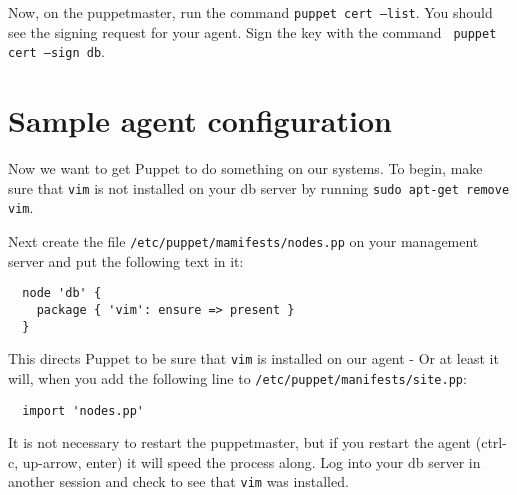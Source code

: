 \documentclass{article}
\begin{document}
Now, on the puppetmaster, run the command \texttt{puppet cert --list}.  You should see the signing request for your agent.  Sign the key with the command \texttt{ puppet cert --sign db}.

\section{Sample agent configuration}
Now we want to get Puppet to do something on our systems.  To begin, make sure that \texttt{vim} is not installed on your db server by running \texttt{sudo apt-get remove vim}.

Next create the file \texttt{/etc/puppet/mamifests/nodes.pp} on your management server and put the following text in it:
\begin{verbatim}
  node 'db' {
    package { 'vim': ensure => present }
  }
\end{verbatim}

This directs Puppet to be sure that \texttt{vim} is installed on our agent - Or at least it will, when you add the following line to \texttt{/etc/puppet/manifests/site.pp}:

\begin{verbatim}
  import 'nodes.pp'
\end{verbatim}

It is not necessary to restart the puppetmaster, but if you restart the agent (ctrl-c, up-arrow, enter) it will speed the process along.  Log into your db server in another session and check to see that \texttt{vim} was installed.
\end{document}
